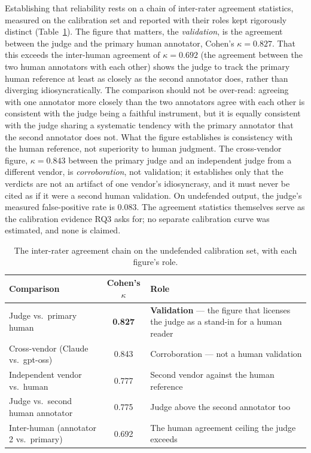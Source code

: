 \documentclass[11pt,a4paper]{report}
\begin{document}
Establishing that reliability rests on a chain of inter-rater agreement statistics, measured
on the calibration set and reported with their roles kept rigorously distinct
(Table~\ref{tab:ch5-kappa}). The figure that matters, the \emph{validation}, is the
agreement between the judge and the primary human annotator, Cohen's $\kappa = 0.827$. That
this exceeds the inter-human agreement of $\kappa = 0.692$ (the agreement between the two human
annotators with each other) shows the judge to track the primary human reference at least as
closely as the second annotator does, rather than diverging idiosyncratically. The comparison
should not be over-read: agreeing with one annotator more closely than the two annotators
agree with each other is consistent with the judge being a faithful instrument, but it is
equally consistent with the judge sharing a systematic tendency with the primary annotator
that the second annotator does not. What the figure establishes is consistency with the human
reference, not superiority to human judgment. The cross-vendor figure, $\kappa = 0.843$ between
the primary judge and an independent judge from a different vendor, is \emph{corroboration},
not validation; it establishes only that the verdicts are not an artifact of one vendor's
idiosyncrasy, and it must never be cited as if it were a second human validation. On
undefended output, the judge's measured false-positive rate is $0.083$. The agreement
statistics themselves serve as the calibration evidence RQ3 asks for; no separate calibration
curve was estimated, and none is claimed.

\begin{table}[h]
\centering
\caption{The inter-rater agreement chain on the undefended calibration set, with each
figure's role.}
\label{tab:ch5-kappa}
\begin{tabularx}{\textwidth}{lcX}
\toprule
\textbf{Comparison} & \textbf{Cohen's $\kappa$} & \textbf{Role}\\
\midrule
Judge vs.\ primary human & \textbf{0.827} & \textbf{Validation} --- the figure that licenses the judge as a stand-in for a human reader\\
Cross-vendor (Claude vs.\ gpt-oss) & 0.843 & Corroboration --- not a human validation\\
Independent vendor vs.\ human & 0.777 & Second vendor against the human reference\\
Judge vs.\ second human annotator & 0.775 & Judge above the second annotator too\\
Inter-human (annotator 2 vs.\ primary) & 0.692 & The human agreement ceiling the judge exceeds\\
\bottomrule
\end{tabularx}
\end{table}
\end{document}
